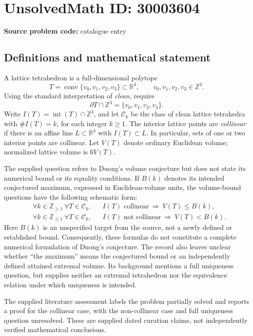 \documentclass[11pt]{article}
\newcommand{\Z}{\mathbb{Z}}
\newcommand{\R}{\mathbb{R}}
\begin{document}
\section*{UnsolvedMath ID: 30003604}
\textbf{Source problem code:} catalogue entry
\subsection{Definitions and mathematical statement}
A lattice tetrahedron is a full-dimensional polytope
\[
T=\operatorname{conv}\{v_0,v_1,v_2,v_3\}\subset\R^3,
\qquad v_0,v_1,v_2,v_3\in\Z^3.
\]
Using the standard interpretation of \emph{clean}, require
\[
\partial T\cap\Z^3=\{v_0,v_1,v_2,v_3\}.
\]
Write \(I(T)=\operatorname{int}(T)\cap\Z^3\), and let \(\mathcal C_k\) be the class of clean lattice tetrahedra with \(\#I(T)=k\), for each integer \(k\geq1\). The interior lattice points are \emph{collinear} if there is an affine line \(L\subset\R^3\) with \(I(T)\subset L\). In particular, sets of one or two interior points are collinear. Let \(V(T)\) denote ordinary Euclidean volume; normalized lattice volume is \(6V(T)\).

The supplied question refers to Duong's volume conjecture but does not state its numerical bound or its equality conditions. If \(B(k)\) denotes its intended conjectured maximum, expressed in Euclidean-volume units, the volume-bound questions have the following schematic form:
\[
\begin{aligned}
&\forall k\in\Z_{\geq1}\ \forall T\in\mathcal C_k,
&&I(T)\text{ collinear}\ \Longrightarrow\ V(T)\leq B(k),\\
&\forall k\in\Z_{\geq1}\ \forall T\in\mathcal C_k,
&&I(T)\text{ not collinear}\ \Longrightarrow\ V(T)<B(k).
\end{aligned}
\]
Here \(B(k)\) is an unspecified target from the source, not a newly defined or established bound. Consequently, these formulas do not constitute a complete numerical formulation of Duong's conjecture. The record also leaves unclear whether ``the maximum'' means the conjectured bound or an independently defined attained extremal volume. Its background mentions a full uniqueness question, but supplies neither an extremal tetrahedron nor the equivalence relation under which uniqueness is intended.

The supplied literature assessment labels the problem partially solved and reports a proof for the collinear case, with the non-collinear case and full uniqueness question unresolved. These are supplied dated curation claims, not independently verified mathematical conclusions.
\end{document}
